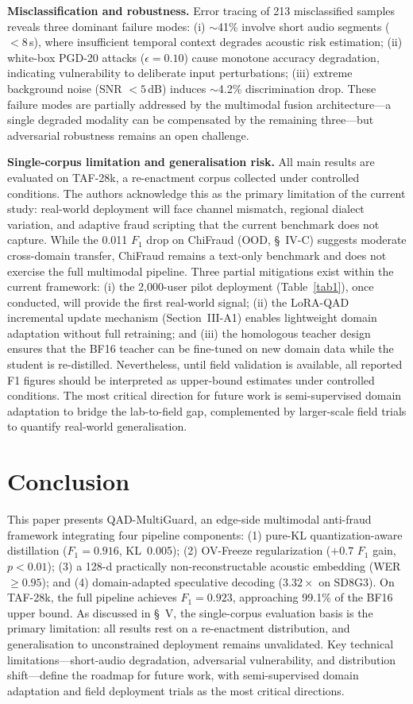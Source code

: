 \documentclass[lettersize,journal]{IEEEtran}
\begin{document}
\textbf{Misclassification and robustness.} Error tracing of 213 misclassified samples reveals three dominant failure modes: (i) $\sim$41\% involve short audio segments ($<8$\,s), where insufficient temporal context degrades acoustic risk estimation; (ii) white-box PGD-20 attacks ($\epsilon=0.10$) cause monotone accuracy degradation, indicating vulnerability to deliberate input perturbations; (iii) extreme background noise (SNR $<5$\,dB) induces $\sim$4.2\% discrimination drop. These failure modes are partially addressed by the multimodal fusion architecture---a single degraded modality can be compensated by the remaining three---but adversarial robustness remains an open challenge.

\textbf{Single-corpus limitation and generalisation risk.} All main results are evaluated on TAF-28k, a re-enactment corpus collected under controlled conditions. The authors acknowledge this as the primary limitation of the current study: real-world deployment will face channel mismatch, regional dialect variation, and adaptive fraud scripting that the current benchmark does not capture. While the 0.011 $F_1$ drop on ChiFraud (OOD, \S~IV-C) suggests moderate cross-domain transfer, ChiFraud remains a text-only benchmark and does not exercise the full multimodal pipeline. Three partial mitigations exist within the current framework: (i) the 2{,}000-user pilot deployment (Table~\ref{tab1}), once conducted, will provide the first real-world signal; (ii) the LoRA-QAD incremental update mechanism (Section~III-A1) enables lightweight domain adaptation without full retraining; and (iii) the homologous teacher design ensures that the BF16 teacher can be fine-tuned on new domain data while the student is re-distilled. Nevertheless, until field validation is available, all reported F1 figures should be interpreted as upper-bound estimates under controlled conditions. The most critical direction for future work is semi-supervised domain adaptation to bridge the lab-to-field gap, complemented by larger-scale field trials to quantify real-world generalisation.

\section{Conclusion}

This paper presents QAD-MultiGuard, an edge-side multimodal anti-fraud framework integrating four pipeline components: (1) pure-KL quantization-aware distillation ($F_1=0.916$, KL~0.005); (2) OV-Freeze regularization ($+0.7$ $F_1$ gain, $p<0.01$); (3) a 128-d practically non-reconstructable acoustic embedding (WER~$\ge 0.95$); and (4) domain-adapted speculative decoding ($3.32\times$ on SD8G3). On TAF-28k, the full pipeline achieves $F_1 = 0.923$, approaching 99.1\% of the BF16 upper bound. As discussed in \S~V, the single-corpus evaluation basis is the primary limitation: all results rest on a re-enactment distribution, and generalisation to unconstrained deployment remains unvalidated. Key technical limitations---short-audio degradation, adversarial vulnerability, and distribution shift---define the roadmap for future work, with semi-supervised domain adaptation and field deployment trials as the most critical directions.
\end{document}
